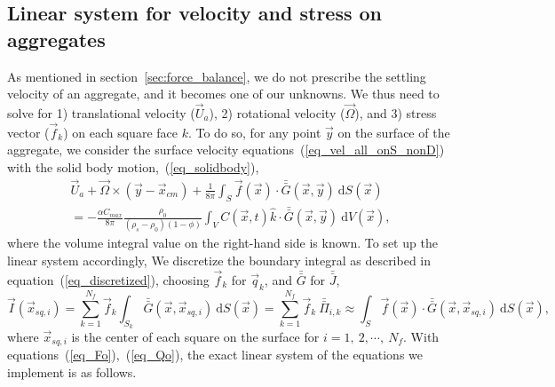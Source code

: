  \subsection{Linear system for velocity and stress on aggregates}
As mentioned in section~\ref{sec:force_balance}, we do not prescribe the settling velocity of an aggregate, and it becomes one of our unknowns.
We thus need to solve for 1) translational velocity ($\vec{U}_a$), 2) rotational velocity ($\vec{\Omega}$), and 3) stress vector ($\vec{f}_k$) on each square face $k$.
To do so, for any point $\vec{y}$ on the surface of the aggregate, we consider the surface velocity equations~(\ref{eq_vel_all_onS_nonD}) with the solid body motion,~(\ref{eq_solidbody}), 
 \begin{align}
	\vec{U}_a + \vec{\Omega} \times (\vec{y} - \vec{x}_{cm})
+ \frac{1}{8 \pi} \int_{S}  
		  \vec{f}(\vec{x}) 
		  \cdot \bar{\bar{G  }} (\vec{x},\vec{y}) 
		  \ \textrm{d}S(\vec{x})
		  \nonumber \\
=  -\frac{ \alpha C_{max}}{8\pi } \frac{\rho_0}{(\rho_s - \rho_0)(1-\phi)} 
\int_{V} C\left(\vec{x},  t \right) \hat{k} \cdot 
\bar{\bar{G}}(\vec{x}, \vec{y} ) 
\ \text{d}V(\vec{x}),
 \label{eq_slp_lin_eq}
 \end{align}
where the volume integral value on the right-hand side is known. 
To set up the linear system accordingly, We discretize the boundary integral as described in equation~(\ref{eq_discretized}), choosing $\vec{f}_k$ for $\vec{q}_k$, and $ \bar{\bar{G}}$ for $\bar{\bar{J}}$, 
\begin{equation}
	\vec{I}(\vec{x}_{sq,i})  =   \sum_{k=1}^{N_f}  \vec{f}_k   \int_{S_{k}} \bar{\bar{G}}(\vec{x},\vec{x}_{sq,i}) \ \text{d}S(\vec{x}) 
	= \sum_{k=1}^{N_f} \vec{f}_k   \ \bar{\bar{\Pi}}_{i,k}
	\approx \int_{S}  
	\vec{f}(\vec{x}) 
	\cdot \bar{\bar{G  }} (\vec{x},\vec{x}_{sq,i}) 
	\ \textrm{d}S(\vec{x}),
\end{equation}
where $\vec{x}_{sq, i}$ is the center of each square on the surface for $i = 1, \  2, \cdots, \  N_f$.
With equations~(\ref{eq_Fo}),~(\ref{eq_Qo}), the exact linear system of the equations we implement is as follows.
